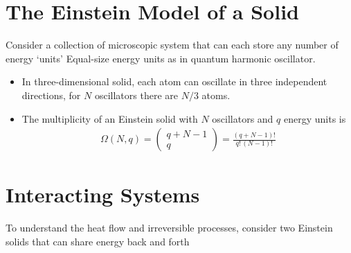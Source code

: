 \documentclass{book}
\begin{document}
\section{The Einstein Model of a Solid}%
\label{sec:einstein model}

Consider a collection of microscopic system that can each store any number of energy `units'
Equal-size energy units as in quantum harmonic oscillator.
\begin{itemize}
	\item In three-dimensional solid, each atom can oscillate in three independent directions, for $N$
	      oscillators there are $N/3$ atoms.
	\item The multiplicity of an Einstein solid with $N$ oscillators and $q$
	      energy units is
	      \begin{align}
		      \label{eq:einstein omega}
		      \Omega(N, q) = \begin{pmatrix}
			                     q + N -1 \\ q
		                     \end{pmatrix} =
		      \frac{(q+N-1)!}{q! \, (N-1)!}
	      \end{align}
\end{itemize}


\section{Interacting Systems}%
\label{sec:Interacting Systems}

To understand the heat flow and irreversible processes, consider two Einstein solids that can
share energy back and forth
\end{document}
